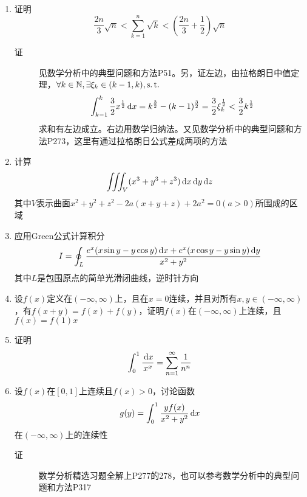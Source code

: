 \begin{enumerate}
\item 证明
\[
\frac{2n}{3}\sqrt{n}<\sum_{k=1}^n\sqrt{k}<\left(\frac{2n}{3}+\frac{1}{2}\right)\sqrt{n}
\]
\begin{description}
\item[证] 见数学分析中的典型问题和方法P51。另，证左边，由拉格朗日中值定理，$\forall k \in \mathbb{N},\exists \xi_k\in(k-1,k),\operatorname{s.t.}$
\[
\int_{k-1}^k \frac{3}{2}x^\frac{1}{2}\,\mathrm{d} x = k^\frac{3}{2}-(k-1)^\frac{3}{2}=\frac{3}{2}\xi_k^\frac{1}{2}<\frac{3}{2}k^\frac{1}{2}
\]
求和有左边成立。右边用数学归纳法。又见数学分析中的典型问题和方法P273，这里有通过拉格朗日公式差成两项的方法
\end{description}

\item 计算
\[
\iiint_V (x^3+y^3+z^3)\,\mathrm{d} x \,\mathrm{d} y \,\mathrm{d} z
\]
其中$V$表示曲面$x^2+y^2+z^2-2a(x+y+z)+2a^2=0(a>0)$所围成的区域

\item 应用Green公式计算积分
\[
I=\oint_L \frac{e^x(x\sin y-y\cos y)\,\mathrm{d} x + e^x(x\cos y-y\sin y)\,\mathrm{d} y}{x^2+y^2}
\]
其中$L$是包围原点的简单光滑闭曲线，逆时针方向

\item 设$f(x)$定义在$(-\infty,\infty)$上，且在$x=0$连续，并且对所有$x,y\in (-\infty,\infty)$，有$f(x+y) = f(x)+f(y)$，证明$f(x)$在$(-\infty,\infty)$上连续，且$f(x)=f(1)x$

\item 证明
\[
\int_0^1 \frac{\,\mathrm{d} x}{x^x}=\sum_{n=1}^{\infty} \frac{1}{n^n}
\]

\item 设$f(x)$在$[0,1]$上连续且$f(x)>0$，讨论函数
\[
g(y)=\int_0^1\frac{yf(x)}{x^2+y^2}\,\mathrm{d} x
\]
在$(-\infty,\infty)$上的连续性
\begin{description}
\item[证] 数学分析精选习题全解上P277的278，也可以参考数学分析中的典型问题和方法P317
\end{description}

































\end{enumerate}